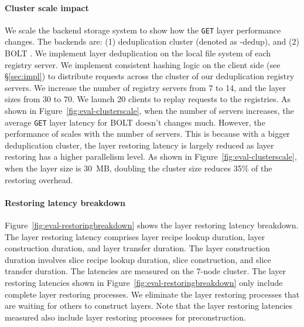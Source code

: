 \paragraph{Cluster scale impact}
We scale the backend storage system to show how the \texttt{GET} layer performance changes. 
The backends are:
 (1) \sysname deduplication cluster (denoted as \sysname-dedup),
 and
 (2) BOLT \cite{littley2019bolt}.
 We implement layer deduplication on the
 local file system of each registry server.
We implement consistent hashing logic on the client side (see \S\ref{sec:impl}) to distribute requests across the cluster of our deduplication registry servers.
We increase the number of registry servers from 7 to 14,
and the layer sizes from 30 to 70.
We launch 20 clients to replay requests to the registries.
%
As shown in Figure~\ref{fig:eval-clusterscale}, 
when the number of servers increases, 
the average \texttt{GET} layer latency for BOLT doesn't changes much.
However, the performance of \sysname scales with the number of servers.
This is because with a bigger deduplication cluster, the layer restoring latency is largely reduced as layer restoring has a higher parallelism level. 
As shown in Figure~\ref{fig:eval-clusterscale}, when the layer size is 30~MB, doubling the cluster size reduces 35\% of the restoring overhead.

\paragraph{Restoring latency breakdown}

Figure~\ref{fig:eval-restoringbreakdown} shows 
the layer restoring latency breakdown.
The layer restoring latency comprises layer recipe lookup duration, layer construction duration, and layer transfer duration.
The layer construction duration involves slice recipe lookup duration, slice construction, and slice transfer duration.
%
The latencies are measured on the 7-node cluster.
The layer restoring latencies shown in Figure~\ref{fig:eval-restoringbreakdown} only include complete layer restoring processes. 
We eliminate the layer restoring processes that are waiting for others to construct layers.
Note that the layer restoring latencies measured also include layer restoring processes for preconstruction.

